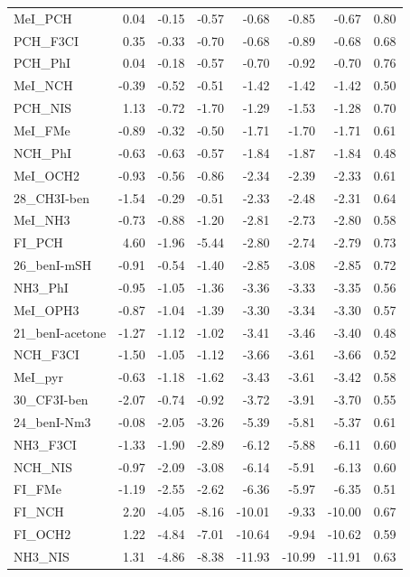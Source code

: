 \documentclass[journal=jcisd8,manuscript=suppinfo]{achemso}
\begin{document}
\begin{singlespace}
{\begin{longtable}{lrrrrrrr}
MeI\_PCH & 0.04 & -0.15 & -0.57 & -0.68 & -0.85 & -0.67 & 0.80\\
PCH\_F3CI & 0.35 & -0.33 & -0.70 & -0.68 & -0.89 & -0.68 & 0.68\\
PCH\_PhI & 0.04 & -0.18 & -0.57 & -0.70 & -0.92 & -0.70 & 0.76\\
MeI\_NCH & -0.39 & -0.52 & -0.51 & -1.42 & -1.42 & -1.42 & 0.50\\
PCH\_NIS & 1.13 & -0.72 & -1.70 & -1.29 & -1.53 & -1.28 & 0.70\\
MeI\_FMe & -0.89 & -0.32 & -0.50 & -1.71 & -1.70 & -1.71 & 0.61\\
NCH\_PhI & -0.63 & -0.63 & -0.57 & -1.84 & -1.87 & -1.84 & 0.48\\
MeI\_OCH2 & -0.93 & -0.56 & -0.86 & -2.34 & -2.39 & -2.33 & 0.61\\
28\_CH3I-ben & -1.54 & -0.29 & -0.51 & -2.33 & -2.48 & -2.31 & 0.64\\
MeI\_NH3 & -0.73 & -0.88 & -1.20 & -2.81 & -2.73 & -2.80 & 0.58\\
FI\_PCH & 4.60 & -1.96 & -5.44 & -2.80 & -2.74 & -2.79 & 0.73\\
26\_benI-mSH & -0.91 & -0.54 & -1.40 & -2.85 & -3.08 & -2.85 & 0.72\\
NH3\_PhI & -0.95 & -1.05 & -1.36 & -3.36 & -3.33 & -3.35 & 0.56\\
MeI\_OPH3 & -0.87 & -1.04 & -1.39 & -3.30 & -3.34 & -3.30 & 0.57\\
21\_benI-acetone & -1.27 & -1.12 & -1.02 & -3.41 & -3.46 & -3.40 & 0.48\\
NCH\_F3CI & -1.50 & -1.05 & -1.12 & -3.66 & -3.61 & -3.66 & 0.52\\
MeI\_pyr & -0.63 & -1.18 & -1.62 & -3.43 & -3.61 & -3.42 & 0.58\\
30\_CF3I-ben & -2.07 & -0.74 & -0.92 & -3.72 & -3.91 & -3.70 & 0.55\\
24\_benI-Nm3 & -0.08 & -2.05 & -3.26 & -5.39 & -5.81 & -5.37 & 0.61\\
NH3\_F3CI & -1.33 & -1.90 & -2.89 & -6.12 & -5.88 & -6.11 & 0.60\\
NCH\_NIS & -0.97 & -2.09 & -3.08 & -6.14 & -5.91 & -6.13 & 0.60\\
FI\_FMe & -1.19 & -2.55 & -2.62 & -6.36 & -5.97 & -6.35 & 0.51\\
FI\_NCH & 2.20 & -4.05 & -8.16 & -10.01 & -9.33 & -10.00 & 0.67\\
FI\_OCH2 & 1.22 & -4.84 & -7.01 & -10.64 & -9.94 & -10.62 & 0.59\\
NH3\_NIS & 1.31 & -4.86 & -8.38 & -11.93 & -10.99 & -11.91 & 0.63\\

\end{longtable}}
\end{singlespace}
\end{document}

